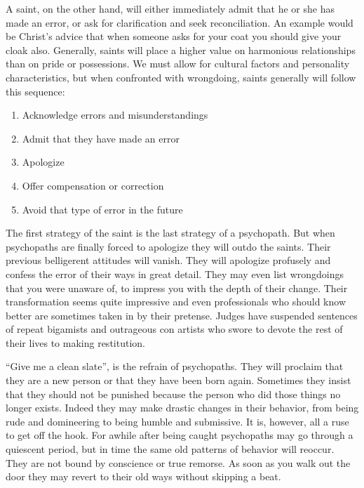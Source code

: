 \documentclass[a5paper,10pt,english]{book}
\begin{document}
\sphinxAtStartPar
A saint, on the other hand, will either immediately admit that he or she
has made an error, or ask for clarification and seek reconciliation. An
example would be Christ’s advice that when someone asks for your coat
you should give your cloak also. Generally, saints will place a higher
value on harmonious relationships than on pride or possessions. We must
allow for cultural factors and personality characteristics, but when
confronted with wrong\sphinxhyphen{}doing, saints generally will follow this sequence:
\begin{enumerate}
%
\item {} 
\sphinxAtStartPar
Acknowledge errors and misunderstandings

\item {} 
\sphinxAtStartPar
Admit that they have made an error

\item {} 
\sphinxAtStartPar
Apologize

\item {} 
\sphinxAtStartPar
Offer compensation or correction

\item {} 
\sphinxAtStartPar
Avoid that type of error in the future

\end{enumerate}

\sphinxAtStartPar
The first strategy of the saint is the last strategy of a psychopath.
But when psychopaths are finally forced to apologize they will outdo the
saints. Their previous belligerent attitudes will vanish. They will
apologize profusely and confess the error of their ways in great detail.
They may even list wrongdoings that you were unaware of, to impress you
with the depth of their change. Their transformation seems quite
impressive and even professionals who should know better are sometimes
taken in by their pretense. Judges have suspended sentences of repeat
bigamists and outrageous con artists who swore to devote the rest of
their lives to making restitution.

\sphinxAtStartPar
“Give me a clean slate”, is the refrain of psychopaths. They will proclaim
that they are a new person or that they have been born again. Sometimes
they insist that they should not be punished because the person who did
those things no longer exists. Indeed they may make drastic changes in
their behavior, from being rude and domineering to being humble and
submissive. It is, however, all a ruse to get off the hook. For awhile
after being caught psychopaths may go through a quiescent period, but in
time the same old patterns of behavior will reoccur. They are not bound
by conscience or true remorse. As soon as you walk out the door they may
revert to their old ways without skipping a beat.
\end{document}
